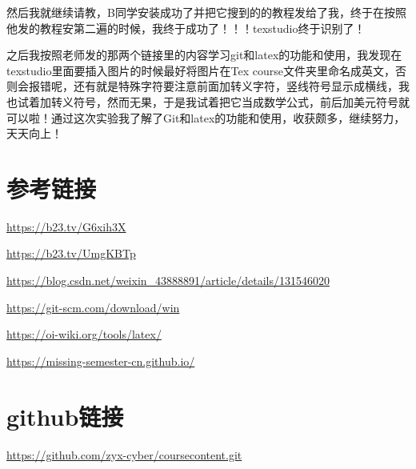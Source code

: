 \documentclass[a4paper ,12pt]{article}
\begin{document}
  然后我就继续请教，B同学安装成功了并把它搜到的的教程发给了我，终于在按照他发的教程安第二遍的时候，我终于成功了！！！texstudio终于识别了！
  
  之后我按照老师发的那两个链接里的内容学习git和latex的功能和使用，我发现在texstudio里面要插入图片的时候最好将图片在Tex course文件夹里命名成英文，否则会报错呢，还有就是特殊字符要注意前面加转义字符，竖线符号显示成横线，我也试着加转义符号，然而无果，于是我试着把它当成数学公式，前后加美元符号就可以啦！通过这次实验我了解了Git和latex的功能和使用，收获颇多，继续努力，天天向上！
  
  \section{参考链接}
  \href{https://b23.tv/G6xih3X}{https://b23.tv/G6xih3X}
  
  \href{https://b23.tv/UmgkBTp}{https://b23.tv/UmgKBTp}
  
  \href{https://blog.csdn.net/weixin_43888891/article/details/131546020}{https://blog.csdn.net/weixin\_43888891/article/details/131546020}
  
  \href{https://git-scm.com/download/win}{https://git-scm.com/download/win}
  
  \href{https://oi-wiki.org/tools/latex/}{https://oi-wiki.org/tools/latex/}
  
  \href{https://missing-semester-cn.github.io/}{https://missing-semester-cn.github.io/}
  
  \section{github链接}
  \href{https://github.com/zyx-cyber/coursecontent.git}{https://github.com/zyx-cyber/coursecontent.git}
  
\end{document}
